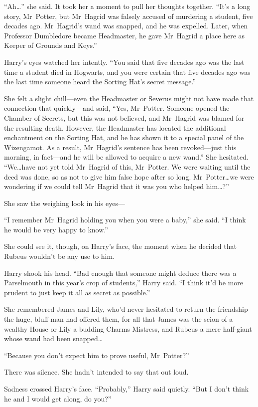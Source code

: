 “Ah…” she said. It took her a moment to pull her thoughts together. “It’s a long story, Mr~Potter, but Mr~Hagrid was falsely accused of murdering a student, five decades ago. Mr~Hagrid’s wand was snapped, and he was expelled. Later, when Professor Dumbledore became Headmaster, he gave Mr~Hagrid a place here as Keeper of Grounds and Keys.”

Harry’s eyes watched her intently. “You said that five decades ago was the last time a student died in Hogwarts, and you were certain that five decades ago was the last time someone heard the Sorting Hat’s secret message.”

She felt a slight chill—even the Headmaster or Severus might not have made that connection that quickly—and said, “Yes, Mr~Potter. Someone opened the Chamber of Secrets, but this was not believed, and Mr~Hagrid was blamed for the resulting death. However, the Headmaster has located the additional enchantment on the Sorting Hat, and he has shown it to a special panel of the Wizengamot. As a result, Mr~Hagrid’s sentence has been revoked—just this morning, in fact—and he will be allowed to acquire a new wand.” She hesitated. “We…have not yet told Mr~Hagrid of this, Mr~Potter. We were waiting until the deed was done, so as not to give him false hope after so long. Mr~Potter…we were wondering if we could tell Mr~Hagrid that it was you who helped him…?”

She saw the weighing look in his eyes—

“I remember Mr~Hagrid holding you when you were a baby,” she said. “I think he would be very happy to know.”

She could see it, though, on Harry’s face, the moment when he decided that Rubeus wouldn’t be any use to him.

Harry shook his head. “Bad enough that someone might deduce there was a Parselmouth in this year’s crop of students,” Harry said. “I think it’d be more prudent to just keep it all as secret as possible.”

She remembered James and Lily, who’d never hesitated to return the friendship the huge, bluff man had offered them, for all that James was the scion of a wealthy House or Lily a budding Charms Mistress, and Rubeus a mere half-giant whose wand had been snapped…

“Because you don’t expect him to prove useful, Mr~Potter?”

There was silence. She hadn’t intended to say that out loud.

Sadness crossed Harry’s face. “Probably,” Harry said quietly. “But I don’t think he and I would get along, do you?”

